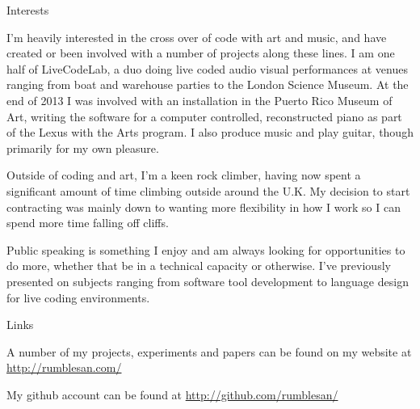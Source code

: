 \documentclass{resume} %
\begin{document}

\begin{rSection}{Interests}

  I'm heavily interested in the cross over of code with art and music, and have created or been involved with a number of projects along these lines. I am one half of LiveCodeLab, a duo doing live coded audio visual performances at venues ranging from boat and warehouse parties to the London Science Museum. At the end of 2013 I was involved with an installation in the Puerto Rico Museum of Art, writing the software for a computer controlled, reconstructed piano as part of the Lexus with the Arts program. I also produce music and play guitar, though primarily for my own pleasure.

  Outside of coding and art, I'm a keen rock climber, having now spent a significant amount of time climbing outside around the U.K. My decision to start contracting was mainly down to wanting more flexibility in how I work so I can spend more time falling off cliffs.

  Public speaking is something I enjoy and am always looking for opportunities to do more, whether that be in a technical capacity or otherwise. I've previously presented on subjects ranging from software tool development to language design for live coding environments.

\end{rSection}

\begin{rSection}{Links}

  A number of my projects, experiments and papers can be found on my website at \url{http://rumblesan.com/}

  My github account can be found at \url{http://github.com/rumblesan/}

\end{rSection}
\end{document}
